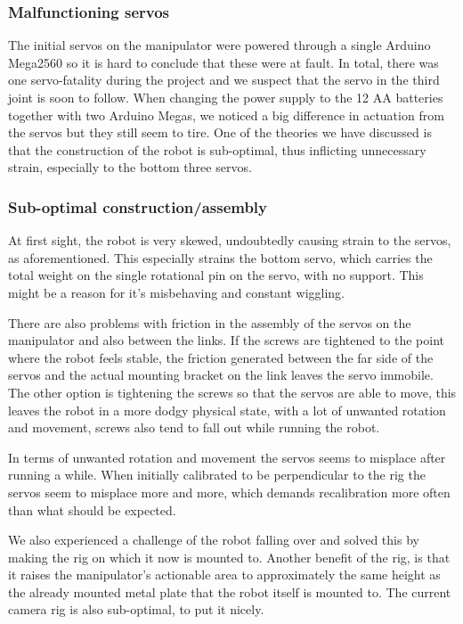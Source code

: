 \documentclass[11pt,a4paper, titlepage]{article}
\begin{document}
\subsubsection*{Malfunctioning servos}
The initial servos on the manipulator were powered through a single Arduino Mega2560 so it is hard to conclude that these were at fault. In total, there was one servo-fatality during the project and we suspect that the servo in the third joint is soon to follow. When changing the power supply to the 12 AA batteries together with two Arduino Megas, we noticed a big difference in actuation from the servos but they still seem to tire. One of the theories we have discussed is that the construction of the robot is sub-optimal, thus inflicting unnecessary strain, especially to the bottom three servos.

\subsubsection*{Sub-optimal construction/assembly}
At first sight, the robot is very skewed, undoubtedly causing strain to the servos, as aforementioned. This especially strains the bottom servo, which carries the total weight on the single rotational pin on the servo, with no support. This might be a reason for it's misbehaving and constant wiggling. 

There are also problems with friction in the assembly of the servos on the manipulator and also between the links. If the screws are tightened to the point where the robot feels stable, the friction generated between the far side of the servos and the actual mounting bracket on the link leaves the servo immobile. The other option is tightening the screws so that the servos are able to move, this leaves the robot in a more dodgy physical state, with a lot of unwanted rotation and movement, screws also tend to fall out while running the robot.

In terms of unwanted rotation and movement the servos seems to misplace after running a while. When initially calibrated to be perpendicular to the rig the servos seem to misplace more and more, which demands recalibration more often than what should be expected.

We also experienced a challenge of the robot falling over and solved this by making the rig on which it now is mounted to. Another benefit of the rig, is that it raises the manipulator's actionable area to approximately the same height as the already mounted metal plate that the robot itself is mounted to. The current camera rig is also sub-optimal, to put it nicely.
\end{document}
